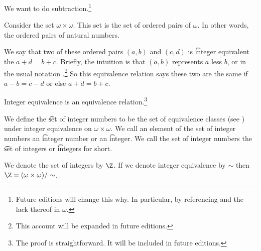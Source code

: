 

We want to do subtraction.\footnote{Future editions will change this why. In particular, by referencing  and the lack thereof in $\omega$.}


Consider the set $\omega \times \omega$.
This set is the set of ordered pairs of $\omega$.
In other words, the ordered pairs of natural numbers.

We say that two of these ordered pairs $(a, b)$ and $(c, d)$ is \t{integer equivalent} the $a + d = b +c$.
Briefly, the intuition is that $(a, b)$ represents $a$ less $b$, or in the usual notation .\footnote{This account will be expanded in future editions.}
So this equivalence relation says these two are the same if $a - b = c - d$ or else $a + d = b + c$.

\begin{proposition}
	Integer equivalence is an equivalence relation.\footnote{The proof is straightforward. It will be included in future editions.}
\end{proposition}

We define the \t{set of integer numbers} to be the set of equivalence classes (see ) under integer equivalence on $\omega \times \omega$.
We call an element of the set of integer numbers an \t{integer number} or an \t{integer}.
We call the set of integer numbers the \t{set of integers} or \t{integers} for short.


We denote the set of integers by $\Z$.
If we denote integer equivalence by $\sim$ then $\Z = (\omega \times \omega)/\sim$.

\blankpage
